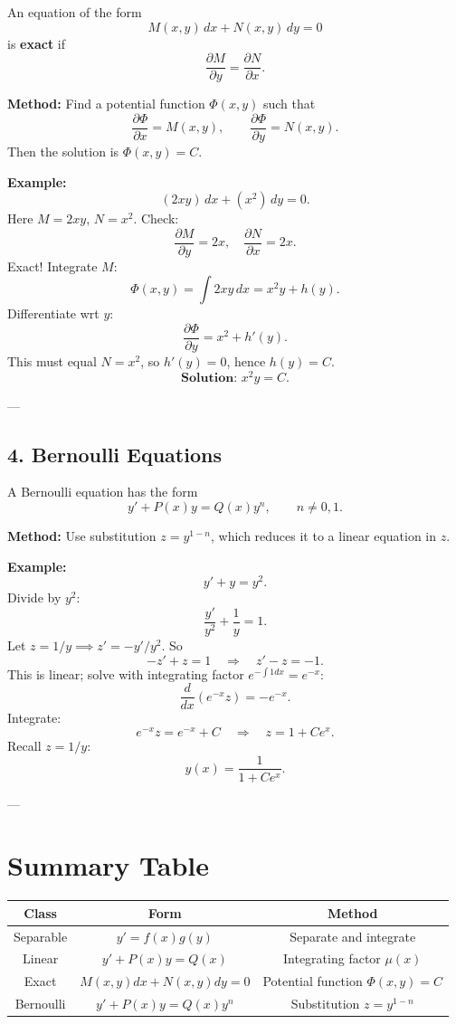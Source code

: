 \documentclass[11pt,a4paper]{article}
\begin{document}
	An equation of the form
	$$
	M(x,y)\,dx + N(x,y)\,dy = 0
	$$
	is \textbf{exact} if
	$$
	\frac{\partial M}{\partial y} = \frac{\partial N}{\partial x}.
	$$
	
	\textbf{Method:} Find a potential function $\Phi(x,y)$ such that
	\[
	\frac{\partial \Phi}{\partial x} = M(x,y), \qquad \frac{\partial \Phi}{\partial y} = N(x,y).
	\]
	Then the solution is $\Phi(x,y) = C$.
	
	\textbf{Example:}
	\[
	(2xy)\,dx + (x^2)\,dy = 0.
	\]
	Here $M=2xy$, $N=x^2$.
	Check:
	\[
	\frac{\partial M}{\partial y} = 2x, \quad \frac{\partial N}{\partial x} = 2x.
	\]
	Exact! Integrate $M$:
	\[
	\Phi(x,y) = \int 2xy\,dx = x^2 y + h(y).
	\]
	Differentiate wrt $y$:
	\[
	\frac{\partial \Phi}{\partial y} = x^2 + h'(y).
	\]
	This must equal $N = x^2$, so $h'(y)=0$, hence $h(y)=C$.
	\[
	\textbf{Solution: } x^2 y = C.
	\]
	
	---
	
	\subsection*{4. Bernoulli Equations}
	
	A Bernoulli equation has the form
	$$
	y' + P(x)y = Q(x)y^n, \qquad n \neq 0,1.
	$$
	
	\textbf{Method:} Use substitution $z = y^{1-n}$, which reduces it to a linear equation in $z$.
	
	\textbf{Example:}
	\[
	y' + y = y^2.
	\]
	Divide by $y^2$:
	\[
	\frac{y'}{y^2} + \frac{1}{y} = 1.
	\]
	Let $z = 1/y \implies z' = -y'/y^2$.
	So
	\[
	-z' + z = 1 \quad \Rightarrow \quad z' - z = -1.
	\]
	This is linear; solve with integrating factor $e^{-\int 1 dx}=e^{-x}$:
	\[
	\frac{d}{dx}(e^{-x} z) = -e^{-x}.
	\]
	Integrate:
	\[
	e^{-x} z = e^{-x} + C \quad \Rightarrow \quad z = 1 + Ce^x.
	\]
	Recall $z=1/y$:
	\[
	y(x) = \frac{1}{1+Ce^x}.
	\]
	
	---
	
	\section*{Summary Table}
	
	\begin{tabular}{|c|c|c|}
		\hline
		\textbf{Class} & \textbf{Form} & \textbf{Method} \\
		\hline
		Separable & $y' = f(x)g(y)$ & Separate and integrate \\
		Linear & $y' + P(x)y = Q(x)$ & Integrating factor $\mu(x)$ \\
		Exact & $M(x,y)dx+N(x,y)dy=0$ & Potential function $\Phi(x,y)=C$ \\
		Bernoulli & $y' + P(x)y = Q(x)y^n$ & Substitution $z=y^{1-n}$ \\
		\hline
	\end{tabular}
\end{document}
